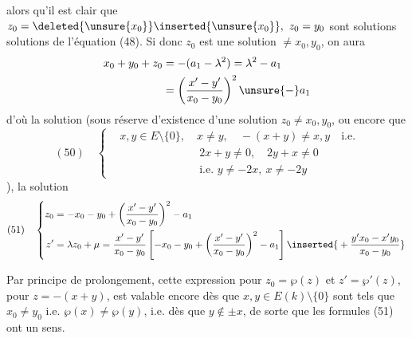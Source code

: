 
alors qu'il est clair que $z_0=\deleted{\unsure{x_0}}\inserted{\unsure{x_0}},\ z_0=y_0$
sont solutions solutions de l'équation (48).
Si donc $z_0$ est une solution $\ne x_0,y_0$, on aura
\[
\begin{aligned}
x_0+y_0+z_0&=-(a_1-\lambda^2)=\lambda^2-a_1\\
&=\left(\frac{x'-y'}{x_0-y_0}\right)^2\unsure{-}a_1
\end{aligned}
\]
d'où la solution (sous réserve d'existence d'une solution $z_0\ne x_0,y_0$,
ou encore   que
\[
(50)\quad\left\{\begin{aligned}
&x,y\in E\setminus\{0\},\quad x\ne y,\quad -(x+y)\ne x,y\quad\text{i.e.}\\
&\hspace{3cm}2x+y\ne0,\quad2y+x\ne0\\
&\hspace{3cm}\text{i.e. }y\ne-2x,\ x\ne-2y
\end{aligned}\right.
\]
), la solution
\[
(51)\quad\left\{\begin{aligned}
z_0&=-x_0-y_0+\left(\frac{x'-y'}{x_0-y_0}\right)^2-a_1\\
z'&=\lambda z_0+\mu=\frac{x'-y'}{x_0-y_0}
\left[-x_0-y_0+\left(\frac{x'-y'}{x_0-y_0}\right)^2-a_1\right]
\inserted{{}+\frac{y'x_0-x'y_0}{x_0-y_0}}
\end{aligned}\right.
\]

Par principe de prolongement, cette expression pour $z_0=\wp(z)$ et $z'=\wp'(z)$,
pour $z=-(x+y)$, est valable encore dès que $x,y\in E(k)\setminus\{0\}$
sont tels que $x_0\ne y_0$ i.e. $\wp(x)\ne\wp(y)$, i.e. dès que
 $y\notin\pm x$, de sorte que les formules (51) ont un sens.
